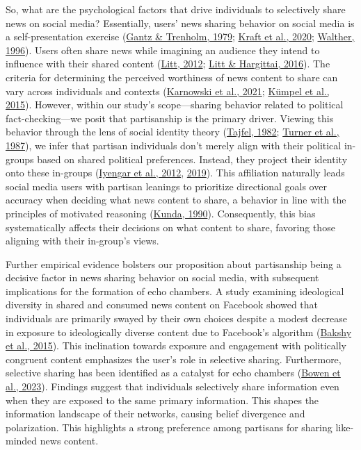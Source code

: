 \documentclass[
  12pt,
]{article}
\begin{document}
So, what are the psychological factors that drive individuals to
selectively share news on social media? Essentially, users' news sharing
behavior on social media is a self-presentation exercise
(\protect\hyperlink{ref-gantz1979people}{Gantz \& Trenholm, 1979};
\protect\hyperlink{ref-kraft2020social}{Kraft et al., 2020};
\protect\hyperlink{ref-walther1996computer}{Walther, 1996}). Users often
share news while imagining an audience they intend to influence with
their shared content (\protect\hyperlink{ref-litt2012knock}{Litt, 2012};
\protect\hyperlink{ref-litt2016imagined}{Litt \& Hargittai, 2016}). The
criteria for determining the perceived worthiness of news content to
share can vary across individuals and contexts
(\protect\hyperlink{ref-karnowski2021worth}{Karnowski et al., 2021};
\protect\hyperlink{ref-kumpel2015news}{Kümpel et al., 2015}). However,
within our study's scope---sharing behavior related to political
fact-checking---we posit that partisanship is the primary driver.
Viewing this behavior through the lens of social identity theory
(\protect\hyperlink{ref-tajfel1982social}{Tajfel, 1982};
\protect\hyperlink{ref-turner1987rediscovering}{Turner et al., 1987}),
we infer that partisan individuals don't merely align with their
political in-groups based on shared political preferences. Instead, they
project their identity onto these in-groups
(\protect\hyperlink{ref-iyengar2012affect}{Iyengar et al., 2012},
\protect\hyperlink{ref-iyengar2019origins}{2019}). This affiliation
naturally leads social media users with partisan leanings to prioritize
directional goals over accuracy when deciding what news content to
share, a behavior in line with the principles of motivated reasoning
(\protect\hyperlink{ref-kunda1990case}{Kunda, 1990}). Consequently, this
bias systematically affects their decisions on what content to share,
favoring those aligning with their in-group's views.

Further empirical evidence bolsters our proposition about partisanship
being a decisive factor in news sharing behavior on social media, with
subsequent implications for the formation of echo chambers. A study
examining ideological diversity in shared and consumed news content on
Facebook showed that individuals are primarily swayed by their own
choices despite a modest decrease in exposure to ideologically diverse
content due to Facebook's algorithm
(\protect\hyperlink{ref-bakshy2015exposure}{Bakshy et al., 2015}). This
inclination towards exposure and engagement with politically congruent
content emphasizes the user's role in selective sharing. Furthermore,
selective sharing has been identified as a catalyst for echo chambers
(\protect\hyperlink{ref-bowen2023learning}{Bowen et al., 2023}).
Findings suggest that individuals selectively share information even
when they are exposed to the same primary information. This shapes the
information landscape of their networks, causing belief divergence and
polarization. This highlights a strong preference among partisans for
sharing like-minded news content.
\end{document}
